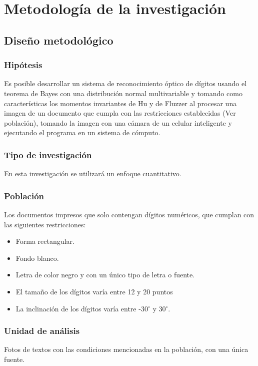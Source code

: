 \documentclass[a4paper, 11pt, oneside]{report}
\begin{document}
\chapter{Metodología de la investigación}
\label{chap:metodology}

\section{Diseño metodológico}
	\subsection{Hipótesis}
	Es posible desarrollar un sistema de reconocimiento óptico de dígitos usando el teorema de Bayes con una distribución normal multivariable y tomando como características los momentos invariantes de Hu y de Fluzzer al procesar una imagen de un documento que cumpla con las restricciones establecidas (Ver población), tomando la imagen con	una cámara de un celular inteligente y ejecutando el programa en un sistema de cómputo.
		
	\subsection{Tipo de investigación}
	En esta investigación se utilizará un enfoque cuantitativo.
	
	\subsection{Población}
	Los documentos impresos que solo contengan dígitos numéricos, que cumplan con las siguientes restricciones:
	\begin{itemize}
	\item Forma rectangular.
	\item Fondo blanco.
	\item Letra de color negro y con un único tipo de letra o fuente.
	\item El tamaño de los dígitos varía entre 12 y 20 puntos
	\item La inclinación de los dígitos varía entre -30$^{\circ}$ y 30$^{\circ}$.
	\end{itemize}
	
	\subsection{Unidad de análisis}
	Fotos de textos con las condiciones mencionadas en la población, con una única fuente.
\end{document}
